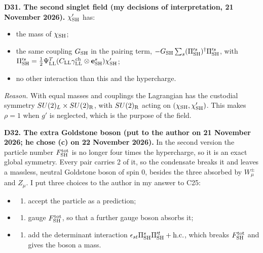 \documentclass[
  10pt,
]{article}
\providecommand{\tightlist}{%
  \setlength{\itemsep}{0pt}\setlength{\parskip}{0pt}}
\begin{document}
\textbf{D31. The second singlet field (my decisions of interpretation,
21 November 2026).} \(\chi'_{\rm SH}\) has:

\begin{itemize}
\tightlist
\item
  the mass of \(\chi_{\rm SH}\);
\item
  the same coupling \(G_{\rm SH}\) in the pairing term,
  \(-G_{\rm SH}\sum_s(\Pi'^s_{\rm SH})^\dagger\Pi'^s_{\rm SH}\), with
  \(\Pi'^s_{\rm SH}=\tfrac12\Psi^T_{\rm LL}(C_{\rm LL}\gamma^{\rm ch}_{\rm LL}\otimes\mathbf e^s_{\rm SH})\chi'_{\rm SH}\);
\item
  no other interaction than this and the hypercharge.
\end{itemize}

\emph{Reason.} With equal masses and couplings the Lagrangian has the
custodial symmetry \(SU(2)_L\times SU(2)_{\rm R}\), with
\(SU(2)_{\rm R}\) acting on \((\chi_{\rm SH},\chi'_{\rm SH})\). This
makes \(\rho=1\) when \(g'\) is neglected, which is the purpose of the
field.

\textbf{D32. The extra Goldstone boson (put to the author on 21 November
2026; he chose (c) on 22 November 2026).} In the second version the
particle number \(F^{\rm tot}_{\rm SH}\) is no longer four times the
hypercharge, so it is an exact global symmetry. Every pair carries 2 of
it, so the condensate breaks it and leaves a massless, neutral Goldstone
boson of spin 0, besides the three absorbed by \(W^\pm_\mu\) and
\(Z_\mu\). I put three choices to the author in my answer to C25:

\begin{itemize}
\item
  \begin{enumerate}
  \def\labelenumi{(\alph{enumi})}
  \tightlist
  \item
    accept the particle as a prediction;
  \end{enumerate}
\item
  \begin{enumerate}
  \def\labelenumi{(\alph{enumi})}
  \setcounter{enumi}{1}
  \tightlist
  \item
    gauge \(F^{\rm tot}_{\rm SH}\), so that a further gauge boson
    absorbs it;
  \end{enumerate}
\item
  \begin{enumerate}
  \def\labelenumi{(\alph{enumi})}
  \setcounter{enumi}{2}
  \tightlist
  \item
    add the determinant interaction
    \(\epsilon_{st}\Pi^s_{\rm SH}\Pi'^t_{\rm SH}+{\rm h.c.}\), which
    breaks \(F^{\rm tot}_{\rm SH}\) and gives the boson a mass.
  \end{enumerate}
\end{itemize}
\end{document}
